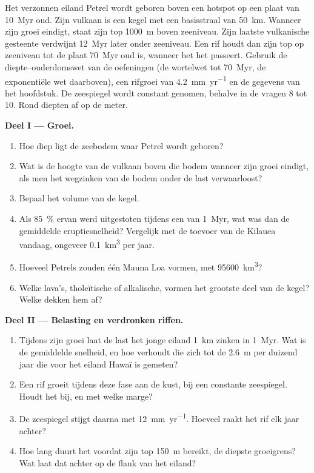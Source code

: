 \begin{problem}\label{pb:b2:oceanic-islands:1}
Het verzonnen eiland Petrel wordt geboren boven een hotspot op een plaat van \qty{10}{Myr} oud. Zijn vulkaan is
een kegel met een basisstraal van \qty{50}{km}. Wanneer zijn groei eindigt, staat zijn top \qty{1000}{m} boven
zeeniveau. Zijn laatste vulkanische gesteente verdwijnt \qty{12}{Myr} later onder zeeniveau. Een rif houdt
dan zijn top op zeeniveau tot de plaat \qty{70}{Myr} oud is, wanneer het  het
 passeert. Gebruik de diepte--ouderdomswet van de oefeningen (de wortelwet tot \qty{70}{Myr}, de
exponentiële wet daarboven), een rifgroei van \qty{4.2}{mm.yr^{-1}} en de gegevens van het hoofdstuk.
De zeespiegel wordt constant genomen, behalve in de vragen 8 tot 10. Rond diepten af op de meter.

\noindent\textbf{Deel I --- Groei.}
\begin{enumerate}
  \item Hoe diep ligt de zeebodem waar Petrel wordt geboren?
  \item Wat is de hoogte van de vulkaan boven die bodem wanneer zijn groei eindigt, als men het
        wegzinken van de bodem onder de last verwaarloost?
  \item Bepaal het volume van de kegel.
  \item Als \qty{85}{\percent} ervan werd uitgestoten tijdens een  van \qty{1}{Myr}, wat was dan de
        gemiddelde eruptiesnelheid? Vergelijk met de toevoer van de Kilauea vandaag, ongeveer
        \qty{0.1}{km^3} per jaar.
  \item Hoeveel Petrels zouden één Mauna Loa vormen, met \qty{95600}{km^3}?
  \item Welke lava's, tholeïtische of alkalische, vormen het grootste deel van de kegel? Welke dekken hem af?
\end{enumerate}

\noindent\textbf{Deel II --- Belasting en verdronken riffen.}
\begin{enumerate}[resume]
  \item Tijdens zijn groei laat de last het jonge eiland \qty{1}{km} zinken in \qty{1}{Myr}. Wat is
        de gemiddelde snelheid, en hoe verhoudt die zich tot de \qty{2.6}{m} per duizend jaar die
        voor het eiland Hawaï is gemeten?
  \item Een rif groeit tijdens deze fase aan de kust, bij een constante zeespiegel. Houdt het bij, en
        met welke marge?
  \item De zeespiegel stijgt daarna met \qty{12}{mm.yr^{-1}}. Hoeveel raakt het rif elk jaar
        achter?
  \item Hoe lang duurt het voordat zijn top \qty{150}{m} bereikt, de diepste groeigrens? Wat laat dat
        achter op de flank van het eiland?
\end{enumerate}


\end{problem}

